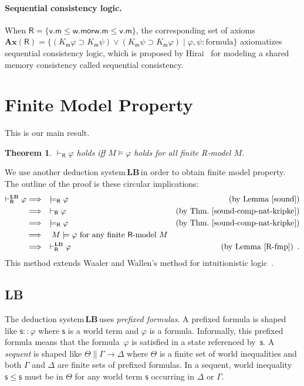 \documentclass[doctor]{iscs-thesis}
\newcommand{\vdashR}{\vdash_{\mathsf R}}
\newcommand{\vdashRLB}{\vdashR^{\mbox{\tiny \LB}}}
\newcommand{\modelsR}{\models_{\mathsf R}}
\newtheorem{theorem}{Theorem}
\newcommand{\LB}{\textbf{LB}}
\newcommand{\wor}{\mathsf{{or}}}
\begin{document}
\paragraph{Sequential consistency logic.}
When $\mathsf R=\{\mathsf v.\mathsf m\le\mathsf w.\mathsf m\wor \mathsf
w.\mathsf m\le \mathsf v.\mathsf m\}$,
the corresponding set of axioms
$\mathbf{Ax}(\mathsf R) = \{(K_{\mathsf m}\varphi\supset K_{\mathsf
m}\psi)\vee(K_{\mathsf m}\psi\supset K_{\mathsf m}\varphi)\mid \varphi,
\psi\colon\mbox{formula}\}$
 axiomatizes sequential consistency logic,
which is proposed by Hirai~\cite{hirailpar} for modeling a shared memory consistency called sequential consistency.


\section{Finite Model Property}
\label{fmp-proof}

This is our main result.
\begin{theorem}
 \label{fmp}
 $\vdashR\varphi$ holds iff $M\models \varphi$ holds
 for all finite {\sf R}-model $M$.
\end{theorem}

We use another deduction system\,\LB\,in order to obtain finite model
property.
The outline of the proof is these circular implications:
\begin{align*}
 \vdashRLB\varphi &\Longrightarrow \quad \models_{\mathsf R}\varphi\quad
 &(\mbox{by Lemma~\ref{sound}})\\
 &\Longrightarrow \quad \vdash_{\mathsf R}\varphi &(\mbox{by
 Thm.~\ref{sound-comp-nat-kripke}}) \\
 &\Longrightarrow\quad \modelsR\varphi &\mbox{(by Thm.~\ref{sound-comp-nat-kripke})}\\
 &\Longrightarrow\quad M\models\varphi \mbox{ for any finite $\mathsf
 R$-model }M\\
 &\Longrightarrow\quad \vdashRLB\varphi & (\mbox{by
 Lemma~\ref{R-fmp}})\enspace .
\end{align*}
This method extends Waaler
and Wallen's method for intuitionistic logic~\cite{waaler1999tableaux}.

\subsection{\LB}

The deduction system\,\LB\,uses \textit{prefixed formulas}.  A
prefixed formula is shaped like $\mathsf s::\varphi$ where $\mathsf s $
is a world term and $\varphi$ is a formula.
Informally, this prefixed formula means that the formula~$\varphi$ is
satisfied in a state referenced by~$\mathsf s$.
A \textit{sequent} is shaped like
  $\Theta\parallel \Gamma\longrightarrow \Delta$ where
$\Theta$ is a finite set of world inequalities and both
$\Gamma$ and $\Delta$ are finite sets of prefixed formulas.
In a sequent, world inequality
$\mathsf s\le \mathsf s$ must be in $\Theta$
 for any world term $\mathsf s$ occurring in $\Delta$ or $\Gamma$.
\end{document}
